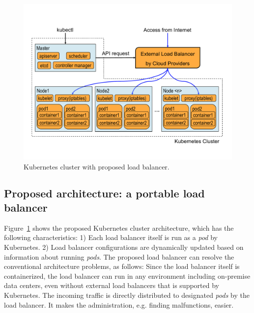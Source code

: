 \begin{figure}[tb]
\includegraphics[width=1.0\columnwidth]{Figs/K8sProposed}
\caption{Kubernetes cluster with proposed load balancer.}
\label{fig:K8sProposed}
\end{figure}

\subsection{Proposed architecture: a portable load balancer}

Figure~\ref{fig:K8sProposed} shows the proposed  Kubernetes cluster architecture, 
which has the following characteristics:
1) Each load balancer itself is run as a {\em pod} by Kubernetes. 
2) Load balancer configurations are dynamically updated based on information about running {\em pods}.
The proposed load balancer can resolve the conventional architecture problems, as follows:
Since the load balancer itself is containerized, the load balancer can run in any environment including on-premise data centers, 
even without external load balancers that is supported by Kubernetes.
The incoming traffic is directly distributed to designated {\em pods} by the load balancer. 
It makes the administration, e.g. finding malfunctions, easier.

